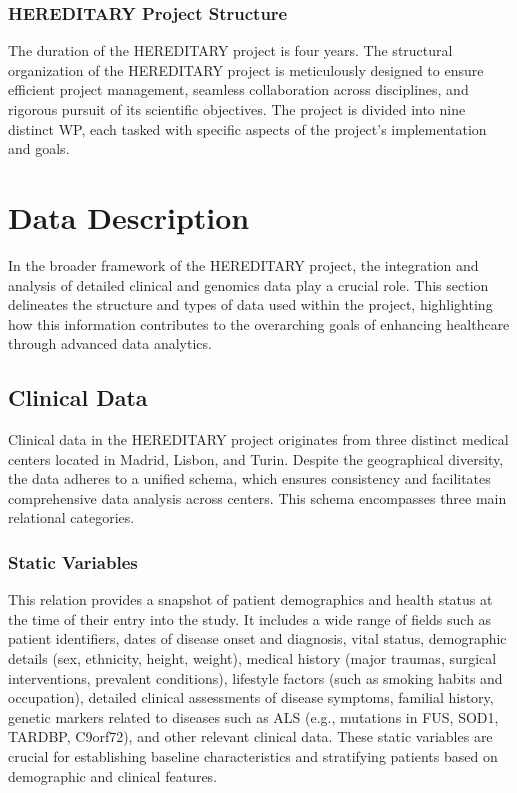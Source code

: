 \subsubsection{\ac{HEREDITARY} Project Structure}
The duration of the \ac{HEREDITARY} project is four years. The structural organization of the \ac{HEREDITARY} project is meticulously designed to ensure efficient project management, seamless collaboration across disciplines, and rigorous pursuit of its scientific objectives. The project is divided into nine distinct \ac{WP}, each tasked with specific aspects of the project's implementation and goals.

\section{Data Description}
In the broader framework of the HEREDITARY project, the integration and analysis of detailed clinical and genomics data play a crucial role. This section delineates the structure and types of data used within the project, highlighting how this information contributes to the overarching goals of enhancing healthcare through advanced data analytics.
\subsection{Clinical Data}
Clinical data in the HEREDITARY project originates from three distinct medical centers located in Madrid, Lisbon, and Turin. Despite the geographical diversity, the data adheres to a unified schema, which ensures consistency and facilitates comprehensive data analysis across centers. This schema encompasses three main relational categories.
\subsubsection{Static Variables}
This relation provides a snapshot of patient demographics and health status at the time of their entry into the study. It includes a wide range of fields such as patient identifiers, dates of disease onset and diagnosis, vital status, demographic details (sex, ethnicity, height, weight), medical history (major traumas, surgical interventions, prevalent conditions), lifestyle factors (such as smoking habits and occupation), detailed clinical assessments of disease symptoms, familial history, genetic markers related to diseases such as ALS (e.g., mutations in FUS, SOD1, TARDBP, C9orf72), and other relevant clinical data. These static variables are crucial for establishing baseline characteristics and stratifying patients based on demographic and clinical features.
